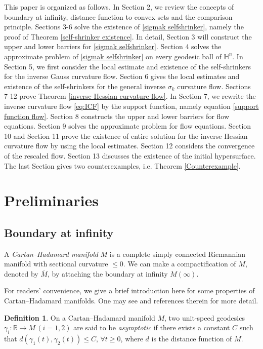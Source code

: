 \documentclass[reqno]{amsart}
\theoremstyle{remark}
\theoremstyle{definition}
\newtheorem{definition}[theorem]{Definition}
\numberwithin{equation}{section}
\begin{document}
This paper is organized as follows. In Section 2, we review the concepts of boundary at infinity, distance function to convex sets and the comparison principle. Sections 3-6 solve the existence of \eqref{sigmak selfshrinker}, namely the proof of Theorem  \ref{self-shrinker existence}.
In detail, Section 3 will construct the upper and lower barriers for \eqref{sigmak selfshrinker}. Section 4 solves the approximate problem of \eqref{sigmak selfshrinker} on every geodesic ball of $\mathbb{H}^n$. In Section 5, we first consider the local estimate and existence of the self-shrinkers for the inverse Gauss curvature flow. Section 6 gives the local estimates and existence of   the self-shrinkers for the general inverse $\sigma_k$ curvature flow. Sections 7-12 prove Theorem \ref{inverse Hessian curvature flow}. In Section 7, we rewrite the inverse curvature flow \eqref{eq:ICF} by the support function, namely equation \eqref{support function flow}. Section 8 constructs the upper and lower barriers for flow equations. Section 9 solves the approximate problem for flow equations. Section 10 and Section 11 prove the existence of entire solution for the inverse Hessian curvature flow by using the local estimates. Section 12 considers the convergence of the rescaled flow. Section 13 discusses the existence of the initial hypersurface. The last Section gives two counterexamples, i.e. Theorem \ref{Counterexample}.     


\section{Preliminaries}\label{Preliminaries}

\subsection{Boundary at infinity}\label{Boundary at infinity}

A \textit{Cartan--Hadamard manifold} $M$ is a complete simply connected Riemannian manifold with sectional curvature $\leqslant 0$. We can make a compactification of $M$, denoted by $\overline{M}$, by attaching the boundary at infinity $M(\infty)$.

 
For readers' convenience, we give a brief introduction here for some properties of Cartan--Hadamard manifolds. One may see   \cite{Visibilitymanifolds, Choi,BishopO'Neill} and references therein for more detail. 

\begin{definition}
    On a Cartan--Hadamard manifold $M$, two unit-speed geodesics $\gamma_i : \mathbb{R} \rightarrow M \, (i=1,2)$ are said to be \textit{asymptotic} if there exists a constant $C$ such that $d(\gamma_1 (t), \gamma_2 (t)) \leqslant C , \, \forall t \geqslant 0$, where $d$ is the distance function of $M$.
\end{definition}
\end{document}
